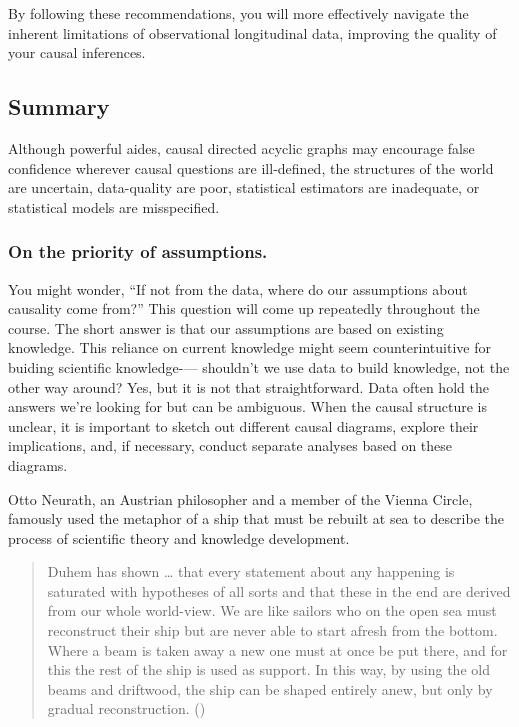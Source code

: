 \documentclass[
  single column]{article}
\begin{document}
By following these recommendations, you will more effectively navigate
the inherent limitations of observational longitudinal data, improving
the quality of your causal inferences.

\subsection{Summary}\label{summary}

Although powerful aides, causal directed acyclic graphs may encourage
false confidence wherever causal questions are ill-defined, the
structures of the world are uncertain, data-quality are poor,
statistical estimators are inadequate, or statistical models are
misspecified.

\subsubsection{On the priority of
assumptions.}\label{on-the-priority-of-assumptions.}

You might wonder, ``If not from the data, where do our assumptions about
causality come from?'' This question will come up repeatedly throughout
the course. The short answer is that our assumptions are based on
existing knowledge. This reliance on current knowledge might seem
counterintuitive for buiding scientific knowledge-\/--- shouldn't we use
data to build knowledge, not the other way around? Yes, but it is not
that straightforward. Data often hold the answers we're looking for but
can be ambiguous. When the causal structure is unclear, it is important
to sketch out different causal diagrams, explore their implications,
and, if necessary, conduct separate analyses based on these diagrams.

Otto Neurath, an Austrian philosopher and a member of the Vienna Circle,
famously used the metaphor of a ship that must be rebuilt at sea to
describe the process of scientific theory and knowledge development.

\begin{quote}
Duhem has shown \ldots{} that every statement about any happening is
saturated with hypotheses of all sorts and that these in the end are
derived from our whole world-view. We are like sailors who on the open
sea must reconstruct their ship but are never able to start afresh from
the bottom. Where a beam is taken away a new one must at once be put
there, and for this the rest of the ship is used as support. In this
way, by using the old beams and driftwood, the ship can be shaped
entirely anew, but only by gradual reconstruction.
()
\end{quote}
\end{document}

